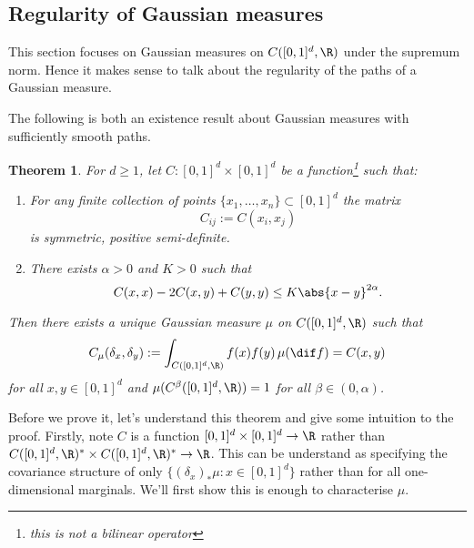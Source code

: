 \documentclass[fontsize=12pt, DIV=10]{scrreprt}
\theoremstyle{mydefn}
\newtheorem{theorem}{Theorem}
\theoremstyle{remark}
\newcommand{\defeq}{:=}
\begin{document}
\subsection{Regularity of Gaussian measures}

\newcommand{\boxspace}{\ensuremath{\R^{[0, 1]^d}}}
\newcommand{\unitbox}{\ensuremath{[0,1]^d}}
This section focuses on Gaussian measures on $C([0,1]^d, \R)$ under the supremum norm. Hence it makes sense to talk about the regularity of the paths of a Gaussian measure.

The following is both an existence result about Gaussian measures with sufficiently smooth paths.
\begin{theorem}
	\label{thm:kcc}
	For $d \geq 1$, let $C: [0, 1]^d \times [0, 1]^d$ be a function\footnote{this is not a bilinear operator} such that:
	\begin{enumerate}
		\item For any finite collection of points $\{x_1, \ldots, x_n\} \subset [0, 1]^d$ the matrix
			\begin{equation}
				C_{ij} \defeq C(x_i, x_j)
			\end{equation}
			is symmetric, positive semi-definite.
		\item There exists $\alpha > 0$ and $K > 0$ such that
			\begin{equation}
				C(x, x) - 2C(x, y) + C(y, y) \leq K \abs{x - y}^{2 \alpha}.
			\end{equation}
	\end{enumerate}
	Then there exists a unique Gaussian measure $\mu$ on $C([0, 1]^d, \R)$ such that
	\begin{equation}
		C_{\mu}(\delta_x, \delta_y) \defeq \int_{C([0, 1]^d, \R)} f(x) f(y) \, \mu(\dif f) = C(x, y)
	\end{equation}
	for all $x, y \in [0, 1]^d$ and $\mu(C^{\beta}([0, 1]^d, \R)) = 1$ for all $\beta \in (0, \alpha)$.
\end{theorem}

Before we prove it, let's understand this theorem and give some intuition to the proof. Firstly, note $C$ is a function $[0,1]^d \times [0, 1]^d \to \R$ rather than $C([0,1]^d, \R)^* \times C([0, 1]^d, \R)^* \to \R$. This can be understand as specifying the covariance structure of only $\{(\delta_x)_* \mu : x \in [0, 1]^d\}$ rather than for all one-dimensional marginals. We'll first show this is enough to characterise $\mu$.
\end{document}
